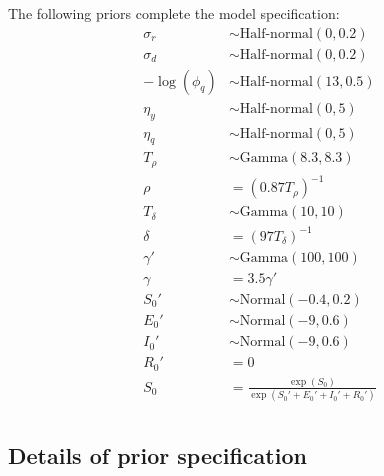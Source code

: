\documentclass[12pt,letterpaper]{article}
\begin{document}
The following priors complete the model specification:
\begin{align}
\sigma_r & \sim \text{Half-normal}(0, 0.2)\\
\sigma_d & \sim \text{Half-normal}(0, 0.2)\\
-\log(\phi_q) & \sim \text{Half-normal}(13, 0.5)\\
\eta_y &\sim \text{Half-normal}(0, 5)\\
\eta_q & \sim \text{Half-normal}(0, 5)\\
T_{\rho} & \sim \text{Gamma}(8.3, 8.3)\\
\rho & = (0.87 T_{\rho})^{-1}\\
T_{\delta} & \sim \text{Gamma}(10, 10)\\
\delta & = (97 T_{\delta})^{-1}\\
\gamma' & \sim \text{Gamma}(100, 100)\\
\gamma & = 3.5\gamma'\\
S_0' & \sim \text{Normal}(-0.4, 0.2)\\
E_0' & \sim \text{Normal}(-9, 0.6)\\
I_0' & \sim \text{Normal}(-9, 0.6)\\
R_0' & = 0\\
S_0 & = \frac{\exp(S_0)}{\exp(S_0' + E_0' + I_0' + R_0')} \\
\end{align}

\subsection*{Details of prior specification}
\end{document}

